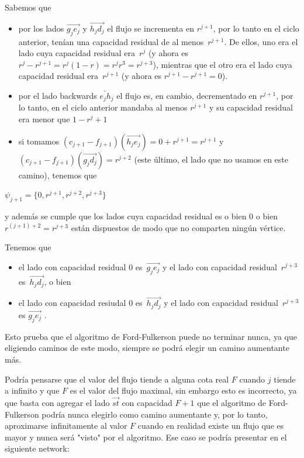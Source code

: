 \documentclass[10pt,a4paper]{article}
\begin{document}
Sabemos que

\begin{itemize}

	\item por los lados $\overrightarrow{g_je_j}$ y $\overrightarrow{h_jd_j}$ el flujo se incrementa en $r^{j+1}$, por lo tanto en el ciclo anterior, tenían una capacidad residual de al menos $r^{j+1}$. De ellos, uno era el lado cuya capacidad residual era $r^j$ (y ahora es $r^j - r^{j+1} = r^j(1-r) = r^jr^3= r^{j+3}$), mientras que el otro era el lado cuya capacidad residual era $r^{j+1}$ (y ahora es $r^{j+1} - r^{j+1} = 0$).
	\item por el lado backwards $\overleftarrow{e_jh_j}$ el flujo es, en cambio, decrementado en $r^{j+1}$, por lo tanto, en el ciclo anterior mandaba al menos $r^{j+1}$ y su capacidad residual era menor que $1 - r^j+1$
	\item si tomamos $(c_{j+1}-f_{j+1})(\overrightarrow{h_je_j})=0+r^{j+1} = r^{j+1}$ y $(c_{j+1}-f_{j+1})(\overrightarrow{g_jd_j})=r^{j+2}$ (este último, el lado que no usamos en este camino), tenemos que
\end{itemize}

\begin{center}
$\psi_{j+1}= \{0, r^{j+1}, r^{j+2}, r^{j+3}\}$
\end{center}

y además se cumple que los lados cuya capacidad residual es o bien $0$ o bien $r^{(j+1) + 2} = r^{j+3}$ están dispuestos de modo que no comparten ningún vértice.

Tenemos que

\begin{itemize}

	\item el lado con capacidad residual $0$ es $\overrightarrow{g_je_j}$ y el lado con capacidad residual $r^{j+3}$ es $\overrightarrow{h_jd_j}$, o bien
	\item el lado con capacidad resiudal $0$ es $\overrightarrow{h_jd_j}$ y el lado con capacidad residual $r^{j+3}$ es $\overrightarrow{g_je_j}$ .
\end{itemize}

Esto prueba que el algoritmo de Ford-Fulkerson puede no terminar nunca, ya que eligiendo caminos de este modo, siempre se podrá elegir un camino aumentante más.

Podría pensarse que el valor del flujo tiende a alguna cota real $F$ cuando $j$ tiende a infinito y que $F$ es el valor del flujo maximal, sin embargo esto es incorrecto, ya que basta con agregar el lado $\overrightarrow{st}$ con capacidad $F + 1$ que el algoritmo de Ford-Fulkerson podría nunca elegirlo como camino aumentante y, por lo tanto, aproximarse infinitamente al valor $F$ cuando en realidad existe un flujo que es mayor y nunca será "visto" por el algoritmo. Ese caso se podría presentar en el siguiente network:
\end{document}

